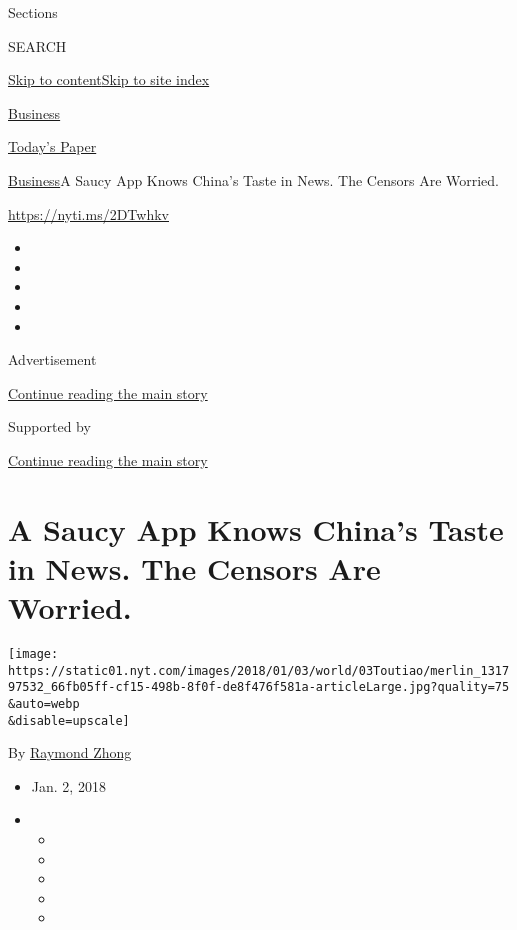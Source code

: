 Sections

SEARCH

\protect\hyperlink{site-content}{Skip to
content}\protect\hyperlink{site-index}{Skip to site index}

\href{https://www.nytimes.com/section/business}{Business}

\href{https://myaccount.nytimes.com/auth/login?response_type=cookie\&client_id=vi}{}

\href{https://www.nytimes.com/section/todayspaper}{Today's Paper}

\href{/section/business}{Business}\textbar{}A Saucy App Knows China's
Taste in News. The Censors Are Worried.

\url{https://nyti.ms/2DTwhkv}

\begin{itemize}
\item
\item
\item
\item
\item
\end{itemize}

Advertisement

\protect\hyperlink{after-top}{Continue reading the main story}

Supported by

\protect\hyperlink{after-sponsor}{Continue reading the main story}

\hypertarget{a-saucy-app-knows-chinas-taste-in-news-the-censors-are-worried}{%
\section{A Saucy App Knows China's Taste in News. The Censors Are
Worried.}\label{a-saucy-app-knows-chinas-taste-in-news-the-censors-are-worried}}

\texttt{[image: https://static01.nyt.com/images/2018/01/03/world/03Toutiao/merlin\_131797532\_66fb05ff-cf15-498b-8f0f-de8f476f581a-articleLarge.jpg?quality=75\\\&auto=webp\\\&disable=upscale]}

By \href{https://www.nytimes.com/by/raymond-zhong}{Raymond Zhong}

\begin{itemize}
\item
  Jan. 2, 2018
\item
  \begin{itemize}
  \item
  \item
  \item
  \item
  \item
  \end{itemize}
\end{itemize}

